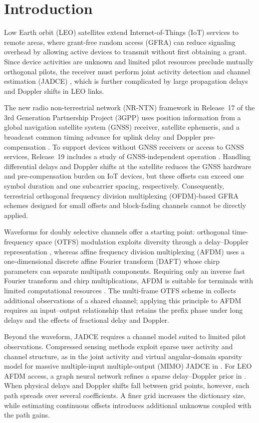 \section{Introduction}
\label{sec:introduction}

Low Earth orbit (LEO) satellites extend Internet-of-Things (IoT)
services to remote areas, where grant-free random access (GFRA) can
reduce signaling overhead by allowing active devices to transmit
without first obtaining a grant. Since device activities are unknown
and limited pilot resources preclude mutually orthogonal pilots,
the receiver must perform joint activity detection and channel
estimation (JADCE) \cite{liu2018}, which is further complicated by
large propagation delays and Doppler shifts in LEO links.

The new radio non-terrestrial network (NR-NTN) framework in Release~17
of the 3rd Generation Partnership Project (3GPP) uses position information
from a global navigation satellite system (GNSS) receiver, satellite
ephemeris, and a broadcast common timing advance for uplink delay and
Doppler pre-compensation \cite{3gpp38300}. To support devices without
GNSS receivers or access to GNSS services, Release~19 includes a study
of GNSS-independent operation \cite{3gpp22865}. Handling differential
delays and Doppler shifts at the satellite reduces the GNSS hardware
and pre-compensation burden on IoT devices, but these offsets can
exceed one symbol duration and one subcarrier spacing, respectively.
Consequently, terrestrial orthogonal frequency division multiplexing
(OFDM)-based GFRA schemes designed for small offsets and block-fading
channels cannot be directly applied.

Waveforms for doubly selective channels offer a starting point:
orthogonal time-frequency space (OTFS) modulation exploits diversity
through a delay--Doppler representation \cite{hadani2017}, whereas
affine frequency division multiplexing (AFDM) uses a one-dimensional
discrete affine Fourier transform (DAFT) whose chirp parameters can
separate multipath components. Requiring only an inverse fast Fourier
transform and chirp multiplications, AFDM is suitable for terminals
with limited computational resources \cite{bemani2022}. The multi-frame
OTFS scheme in \cite{shen2025} collects additional observations of a
shared channel; applying this principle to AFDM requires an input--output
relationship that retains the prefix phase under long delays and
the effects of fractional delay and Doppler.

Beyond the waveform, JADCE requires a channel model suited to limited
pilot observations. Compressed sensing methods exploit sparse user
activity and channel structure, as in the joint activity and virtual
angular-domain sparsity model for massive multiple-input multiple-output
(MIMO) JADCE in \cite{ke2020}. For LEO AFDM access, a graph neural
network refines a sparse delay--Doppler prior in \cite{ding2026}.
When physical delays and Doppler shifts fall between grid points,
however, each path spreads over several coefficients. A finer grid
increases the dictionary size, while estimating continuous offsets
introduces additional unknowns coupled with the path gains.

